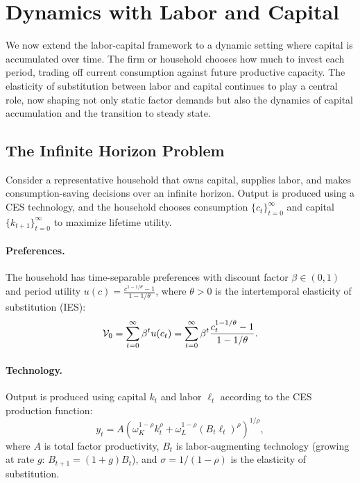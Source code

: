 \section{Dynamics with Labor and Capital}
\label{sec:lc-dynamics}

We now extend the labor-capital framework to a dynamic setting where capital is accumulated over time. The firm or household chooses how much to invest each period, trading off current consumption against future productive capacity. The elasticity of substitution between labor and capital continues to play a central role, now shaping not only static factor demands but also the dynamics of capital accumulation and the transition to steady state.

\subsection{The Infinite Horizon Problem}
\label{subsec:infinite-horizon}

Consider a representative household that owns capital, supplies labor, and makes consumption-saving decisions over an infinite horizon. Output is produced using a CES technology, and the household chooses consumption $\{c_t\}_{t=0}^\infty$ and capital $\{k_{t+1}\}_{t=0}^\infty$ to maximize lifetime utility.

\paragraph{Preferences.}
The household has time-separable preferences with discount factor $\beta \in (0,1)$ and period utility $u(c) = \frac{c^{1-1/\theta} - 1}{1 - 1/\theta}$, where $\theta > 0$ is the intertemporal elasticity of substitution (IES):
\begin{equation}
\mathcal{V}_0 = \sum_{t=0}^{\infty} \beta^t u(c_t) = \sum_{t=0}^{\infty} \beta^t \frac{c_t^{1-1/\theta} - 1}{1 - 1/\theta}.
\label{eq:lifetime-utility}
\end{equation}

\paragraph{Technology.}
Output is produced using capital $k_t$ and labor $\ell_t$ according to the CES production function:
\begin{equation}
y_t = A \left( \omega_K^{1-\rho} k_t^\rho + \omega_L^{1-\rho} (B_t \ell_t)^\rho \right)^{1/\rho},
\label{eq:ces-production-dynamic}
\end{equation}
where $A$ is total factor productivity, $B_t$ is labor-augmenting technology (growing at rate $g$: $B_{t+1} = (1+g) B_t$), and $\sigma = 1/(1-\rho)$ is the elasticity of substitution.

